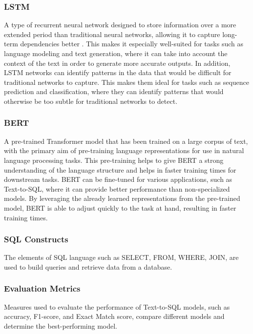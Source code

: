 \subsubsection{\ac{LSTM}}

A type of recurrent neural network designed to store information over a more extended period than traditional neural networks, allowing it to capture long-term dependencies better \cite{Hochreiter1997LongSM}.
This makes it especially well-suited for tasks such as language modeling and text generation, where it can take into account the context of the text in order to generate more accurate outputs.
In addition, LSTM networks can identify patterns in the data that would be difficult for traditional networks to capture. This makes them ideal for tasks such as sequence prediction and classification, where they can identify patterns that would otherwise be too subtle for traditional networks to detect.

\subsubsection{\ac{BERT}}

A pre-trained Transformer model that has been trained on a large corpus of text, with the primary aim of pre-training language representations for use in natural language processing tasks\cite{devlin-etal-2019-bert}. This pre-training helps to give BERT a strong understanding of the language structure and helps in faster training times for downstream tasks. BERT can be fine-tuned for various applications, such as Text-to-SQL, where it can provide better performance than non-specialized models. By leveraging the already learned representations from the pre-trained model, BERT is able to adjust quickly to the task at hand, resulting in faster training times.

\subsubsection{SQL Constructs}

The elements of SQL language such as SELECT, FROM, WHERE, JOIN, are used to build queries and retrieve data from a database.

\subsubsection{Evaluation Metrics}

Measures used to evaluate the performance of Text-to-SQL models, such as accuracy, F1-score, and Exact Match score, compare different models and determine the best-performing model.

